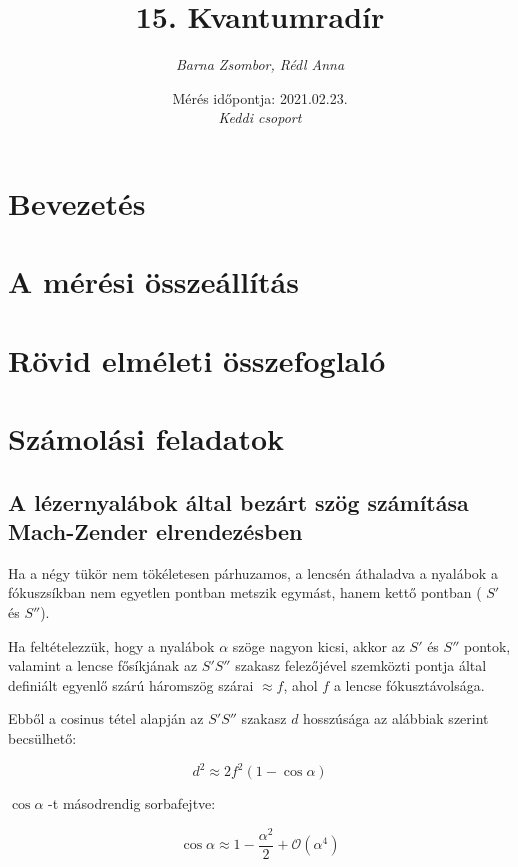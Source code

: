 \documentclass[12pt,a4paper]{article}
\title{\Huge{\textbf{15. Kvantumradír}}}
\author{\textsl{Barna Zsombor, Rédl Anna}}
\date{Mérés időpontja: 2021.02.23.\\
	\textsl{Keddi csoport}\\}
\begin{document}
\begin{titlepage}
\maketitle
\end{titlepage}

\section{Bevezetés}
\setcounter{page}{1}


\section{A mérési összeállítás}


\section{Rövid elméleti összefoglaló}


\section{Számolási feladatok}

\subsection{A lézernyalábok által bezárt szög számítása Mach-Zender elrendezésben}

Ha a négy tükör nem tökéletesen párhuzamos, a lencsén áthaladva a nyalábok a fókuszsíkban nem egyetlen pontban metszik egymást, hanem kettő pontban ( $S'$ és $S''$). 

Ha feltételezzük, hogy a nyalábok $\alpha$ szöge nagyon kicsi, akkor az $S'$ és $S''$ pontok, valamint a lencse fősíkjának az $S'S''$ szakasz felezőjével szemközti pontja által definiált egyenlő szárú háromszög szárai $\approx f$, ahol $f$ a lencse fókusztávolsága. 

Ebből a cosinus tétel alapján az $S'S''$ szakasz $d$ hosszúsága az alábbiak szerint becsülhető:

\begin{equation}
d^2\approx 2f^2(1-\cos\alpha)
\end{equation}

$\cos{\alpha}$ -t másodrendig sorbafejtve:

\begin{equation*}
    \cos{\alpha}\approx 1-\frac{\alpha^2}{2}+\mathcal{O}(\alpha^4)
\end{equation*}
\end{document}

